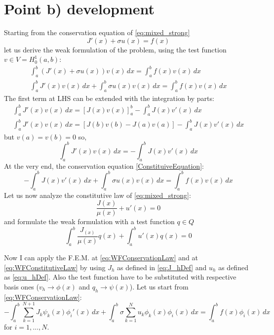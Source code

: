 \documentclass{article}
\begin{document}
\section{Point b) development}
Starting from the conservation equation of \eqref{eq:mixed_strong}
\begin{equation}
    J'(x)+\sigma u(x) = f(x) 
    \label{ConstituiveEquation}
\end{equation}
let us derive the weak formulation of the problem, using the test function $v \in V = H_0^1(a,b)$:
\begin{align*} 
    \int_a^b (J'(x) + \sigma u(x)) v(x) \, dx = \int_a^b f(x) v(x) \, dx \\
    \int_a^b J'(x) v(x) \, dx + \int_a^b \sigma u(x) v(x) \, dx = \int_a^b f(x) v(x) \,  dx
\end{align*}
The first term at LHS can be extended with the integration by parts:
\begin{align*}
    \int_a^b J'(x) v(x) \, dx= [J(x)v(x)]_a^b - \int_a^b J(x) v'(x) \, dx \\
    \int_a^b J'(x) v(x)\, dx = [J(b)v(b) - J(a) v(a)] - \int_a^b J(x) v'(x) \, dx
\end{align*}
but $v(a)=v(b)=0$ so,
\begin{equation*}
    \int_a^b J'(x) v(x) \, dx= - \int_a^b J(x) v'(x) \, dx
\end{equation*}
At the very end, the conservation equation \eqref{ConstituiveEquation}:
\begin{equation}
    - \int_a^b J(x) v'(x) \, dx  + \int_a^b \sigma u(x) v(x) \, dx = \int_a^b f(x) v(x) \,  dx
    \label{eq:WFConservationLaw}
\end{equation}
Let us now analyze the constitutive law of \eqref{eq:mixed_strong}:
\begin{equation*}
    \frac{J(x)}{\mu(x)} + u'(x) = 0 
\end{equation*}
and formulate the weak formulation with a test function $q \in Q$
\begin{equation}
    \int_a^b \frac{J_(x)}{\mu(x)} q(x) + \int_a^b u'(x) q(x) = 0 
    \label{eq:WFConstitutiveLaw}
\end{equation}

Now I can apply the F.E.M. at \eqref{eq:WFConservationLaw} and at \eqref{eq:WFConstitutiveLaw} by using $J_h$ as defined in \eqref{eq:J_hDef} and $u_h$ as defined as \eqref{eq:u_hDef}. Also the test function have to be substituted with respective basis ones ($v_h \rightarrow \phi(x)$  and $q_h \rightarrow \psi(x)$). 
Let us start from \eqref{eq:WFConservationLaw}:
\begin{equation*}
    - \int_a^b \sum_{k=1}^{N+1} J_k \psi_k(x) \phi_i'(x) \, dx  + \int_a^b \sigma \sum_{k=1}^{N} u_k \phi_k(x) \phi_i(x) \, dx = \int_a^b f(x) \phi_i(x) \,  dx
\end{equation*}
for $i=1,...,N$.
\end{document}
